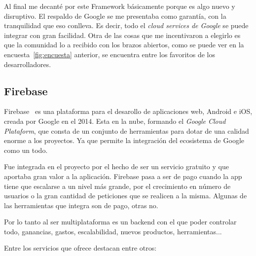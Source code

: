 Al final me decanté por este Framework básicamente porque es algo nuevo y disruptivo. El respaldo de Google se me presentaba como garantía, con la tranquilidad que eso conlleva. Es decir, todo el \emph{cloud services de Google} se puede integrar con gran facilidad.
Otra de las cosas que me incentivaron a elegirlo es que la comunidad lo a recibido con los brazos abiertos, como se puede ver en la encuesta~\ref{fig:encuesta} anterior, se encuentra entre los favoritos de los desarrolladores.

\subsection{Firebase}
Firebase~\cite{wiki:firebase} es una plataforma para el desarollo de aplicaciones web, Android e iOS, creada por Google en el 2014. Esta en la nube, formando el \emph{Google Cloud Plataform}, que consta de un conjunto de herramientas para dotar de una calidad enorme a los proyectos. Ya que permite la integración del ecosistema de Google como un todo.

Fue integrada en el proyecto por el hecho de ser un servicio gratuito y que aportaba gran valor a la aplicación. Firebase pasa a ser de pago cuando la app tiene que escalarse a un nivel más grande, por el crecimiento en número de usuarios o la gran cantidad de peticiones que se realicen a la misma. Algunas de las herramientas que integra son de pago, otras no.

Por lo tanto al ser multiplataforma es un backend con el que poder controlar todo, ganancias, gastos, escalabilidad, nuevos productos, herramientas... 

Entre los servicios que ofrece destacan entre otros:

